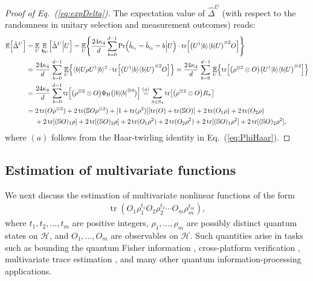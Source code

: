 \documentclass[aps,prl,twocolumn,nofootinbib,superscriptaddress,10pt]{revtex4-2}
\let\originalleft\left
\let\originalright\right
\renewcommand{\left}{\mathopen{}\mathclose\bgroup\originalleft}
\renewcommand{\right}{\aftergroup\egroup\originalright}
\def\E{ {\mathbb E} } %
\def\>{\rangle}
\def\<{\langle}
\newcommand{\ketbra}[2]{\ensuremath{\left|#1\right\rangle\!\left\langle#2\right|}}
\DeclareMathOperator{\Tr}{tr}
\theoremstyle{plain}
\theoremstyle{definition}
\newcommand{\caH}{\mathcal{H}}
\newcommand{\eref}[1]{Eq.~\textup{(\ref{#1})}}
\begin{document}
\begin{proof}[Proof of \eref{eq:expDelta}]
The expectation value of $\hat{\Delta}^{U}$ (with respect to the randomness in unitary selection and measurement outcomes) reads: 
\begin{align}
\E \left[ \hat{\Delta}^{U}\right] 
&=\underset{U }{\E} \, \underset{\,\mathbf{b}_{U}}{\E} \left[ \hat{\Delta}^{U} \Big| U \right]
 =\underset{U }{\E} \left\{ \frac{24\kappa_{4}}{d} \sum_{b=0}^{d-1} 
            \Pr\left(\hat{b}_{i_1}=\hat{b}_{i_2}=b \Big|U \right) \cdot \Tr \left[ \left(U^{\dag}|b\>\<b|U\right)^{\otimes 2}O\right]\right\} 
\nonumber \\
&=\frac{24\kappa_{4}}{d}\, \sum_{b=0}^{d-1} \, \underset{U }{\E} \left\{ \<b|U\rho U^{\dag}|b\>^2 \cdot \Tr \left[ \left(U^{\dag}|b\>\<b|U\right)^{\otimes 2}O\right] \right\} 
=
\frac{24\kappa_{4}}{d} \,\sum_{b=0}^{d-1} \,\underset{U }{\E} \left\{ \Tr \left[ \left( \rho^{\otimes 2}\otimes O \right) \left(U^{\dag}|b\>\<b|U\right)^{\otimes 4}\right] \right\}
\nonumber \\
&=
\frac{24\kappa_{4}}{d} \,\sum_{b=0}^{d-1} \Tr \left[ \left( \rho^{\otimes 2}\otimes O \right)  
\Phi_{\rm H} \big( \ketbra{b}{b}^{\otimes {4}} \big) \right]
\stackrel{(a)}{=}
\sum_{\pi\in \mathrm{S}_{4}}  \Tr\left[ \left(\rho^{\otimes 2} \otimes O \right)R_\pi\right]
\nonumber \\
&= 2 \Tr(O \rho^{\otimes 2}) + 2 \Tr(\mathbb{S}O \rho^{\otimes 2})+ [1+\Tr(\rho^2)] [\Tr(O) + \Tr(\mathbb{S}O)] + 2 \Tr(O_1\rho)+ 2 \Tr(O_2\rho)
\nonumber \\
&\quad\ 
+ 2 \Tr[(\mathbb{S}O)_1\rho]
+ 2 \Tr[(\mathbb{S}O)_2\rho] 
+ 2 \Tr(O_1\rho^2)+ 2 \Tr(O_2\rho^2) + 2 \Tr[(\mathbb{S}O)_1\rho^2] 
+ 2 \Tr[(\mathbb{S}O)_2\rho^2] , 
\end{align}
where $(a)$ follows from the Haar-twirling identity in \eref{eq:PhiHaar}.
\end{proof}



\subsection{Estimation of multivariate functions}

We next discuss the estimation of multivariate nonlinear functions of the form
\begin{align}\label{eq:multivariate_target}
\Tr(O_1\rho_1^{t_1} O_2\rho_2^{t_2}\cdots O_m\rho_m^{t_m}),
\end{align}
where $t_1,t_2,\dots,t_m$ are positive integers, $\rho_1,\dots,\rho_m$ are possibly distinct quantum states on $\caH$, and $O_1,\dots,O_m$ are observables on  $\caH$. 
Such quantities arise in tasks such as bounding the quantum Fisher information \cite{PRXQuantum.5.030338,PhysRevLett.127.260501,PhysRevLett.134.110802}, cross-platform verification \cite{anshu2022distributed,PhysRevLett.124.010504}, multivariate trace estimation \cite{Quek2024multivariatetrace}, and many other quantum information-processing applications.
\end{document}
